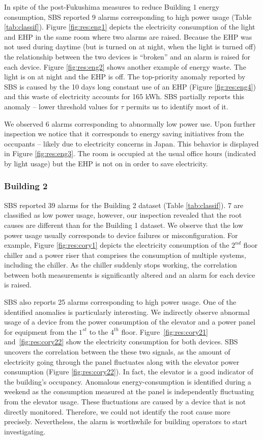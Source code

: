 In spite of the post-Fukushima measures to reduce Building 1 energy consumption, 
SBS reported 9 alarms corresponding to high power usage (Table \ref{tab:classif}).
Figure \ref{fig:res:eng1} depicts the electricity consumption of the light and EHP in the same room where two alarms are raised.
Because the EHP was not used during daytime (but is turned on at night, when the light is turned off) the relationship between the two devices 
is ``broken'' and an alarm is raised for each device.
Figure \ref{fig:res:eng2} shows another example of energy waste.  The light is on at night and the EHP is off.
The top-priority anomaly reported by SBS is caused by the 10 days long constant use of an EHP (Figure \ref{fig:res:eng4}) and this 
waste of electricity accounts for 165 kWh.
SBS partially reports this anomaly -- lower threshold values for $\tau$ permits us to identify most of it.


We observed 6 alarms corresponding to abnormally low power use.  Upon further inspection we notice that it corresponds to energy saving
 initiatives from the occupants -- likely due to electricity concerns in Japan.
This behavior is displayed in Figure \ref{fig:res:eng3}.  The room is occupied at the usual office hours (indicated by light usage)  but the 
EHP is not on in order to save electricity.

\subsubsection{Building 2}
SBS reported 39 alarms for the Building 2 dataset (Table \ref{tab:classif}).
 7 are classified as low power usage, however, our inspection revealed that the root causes are different than for the Building 1 dataset.
We observe that the low power usage usually corresponds to device failures or misconfiguration.  
For example, Figure \ref{fig:res:cory1} depicts the electricity consumption of the $2^{nd}$ floor chiller and a power riser that comprises the consumption of multiple systems, including the chiller.
As the chiller suddenly stops working, the correlation between both measurements is significantly altered and an alarm for each device is raised.

SBS also reports 25 alarms corresponding to high power usage. 
One of the identified anomalies is particularly interesting.
We indirectly observe abnormal usage of a device from the power consumption of the elevator and a power panel for equipment from 
the $1^{st}$ to the $4^{th}$ floor.
Figure~\ref{fig:res:cory21} and~\ref{fig:res:cory22} show the electricity consumption for both devices. 
SBS uncovers the correlation between the these two signals, as the amount of electricity going through the panel fluctuates along with the elevator power consumption (Figure \ref{fig:res:cory22}).
In fact, the elevator is a good indicator of the building's occupancy.
Anomalous energy-consumption is identified during a weekend as the consumption measured at the panel is independently fluctuating from the elevator usage.
These fluctuations are caused by a device that is not directly monitored.  Therefore, we could not identify the root cause more precisely. 
 Nevertheless, the alarm is worthwhile for building operators to start investigating.

